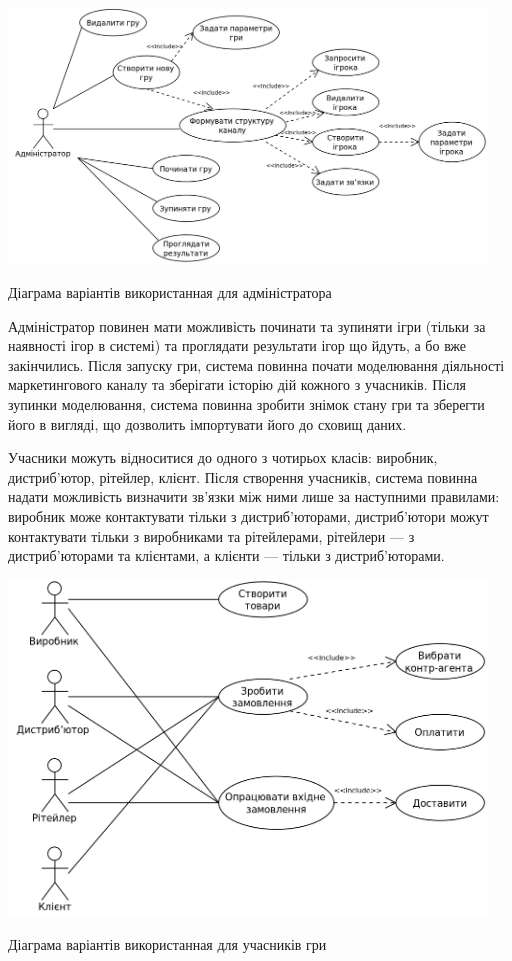             \begin{stdfigure}
                \includegraphics[width=5in]{images/uml_uc_admin.png}
                \caption{Діаграма варіантів використанная для адміністратора}
                \label{fig:uml_uc_admin}
            \end{stdfigure}

Адміністратор повинен мати можливість починати та зупиняти ігри (тільки за наявності ігор в системі) та проглядати результати ігор що йдуть, а бо вже закінчились. Після запуску гри, система повинна почати моделювання діяльності маркетингового каналу та зберігати історію дій кожного з учасників. Після зупинки моделювання, система повинна зробити знімок стану гри та зберегти його в вигляді, що дозволить імпортувати його до сховищ даних.

Учасники можуть відноситися до одного з чотирьох класів: виробник, дистриб’ютор, рітейлер, клієнт. Після створення учасників, система повинна надати можливість визначити зв’язки між ними лише за наступними правилами: виробник може контактувати тільки з дистриб’юторами, дистриб’ютори можут контактувати тільки з виробниками та рітейлерами, рітейлери --- з дистриб’юторами та клієнтами, а клієнти --- тільки з дистриб’юторами.

            \begin{stdfigure}
                \includegraphics[width=5in]{images/uml_uc_players.png}
                \caption{Діаграма варіантів використанная для учасників гри}
                \label{fig:uml_uc_players}
            \end{stdfigure}


